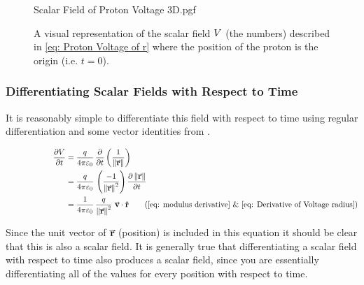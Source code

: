 \documentclass[main.tex]{subfiles}
\begin{document}
                \begin{figure}[h]
                    \centering
                    \scalebox{1}
                    {
                        \begin{adjustbox}{clip,trim=20mm 25mm 20mm 20mm}
                            {{Scalar Field of Proton Voltage 3D.pgf}}
                        \end{adjustbox}
                    }
                    \captionsetup{singlelinecheck=off}
                    \caption[.]{A visual representation of the scalar field $\protect V$ (the numbers) described in \eqref{eq: Proton Voltage of r} where the position of the proton is the origin (i.e. $t=0$).}
                    \label{fig: Scalar Field of Proton Voltage 3D}
                \end{figure}
                \FloatBarrier
                \vspace{2em}



                \subsubsection{Differentiating Scalar Fields with Respect to Time}
                    \label{subsubsec: Differentiating Scalar Fields with Respect to Time}

                    It is reasonably simple to differentiate this field with respect to time using regular differentiation and some vector identities from .

                    \begin{align*}
                        \hspace*{6em}\frac{\partial V}{\partial t} &= \frac{q}{4\pi\varepsilon_0}\, \frac{\partial}{\partial t}\left(\frac{1}{\vmod{\vect{r}}}\right)\\
                        &= \frac{q}{4\pi\varepsilon_0}\, \left(\frac{-1}{\vmod{\vect{r}}^2}\right)\frac{\partial\vmod{\vect{r}}}{\partial t}\\
                        &=\frac{1}{4\pi\varepsilon_0}\, \frac{q}{\vmod{\vect{r}}^2}\ \vect{v}\cdot\vhat{r} \tag{\eqref{eq: modulus derivative} \& \eqref{eq: Derivative of Voltage radius}}
                    \end{align*}

                    Since the unit vector of $\vect{r}$ (position) is included in this equation it should be clear that this is also a scalar field. It is generally true that differentiating a scalar field with respect to time also produces a scalar field, since you are essentially differentiating all of the values for every position with respect to time.
\end{document}
